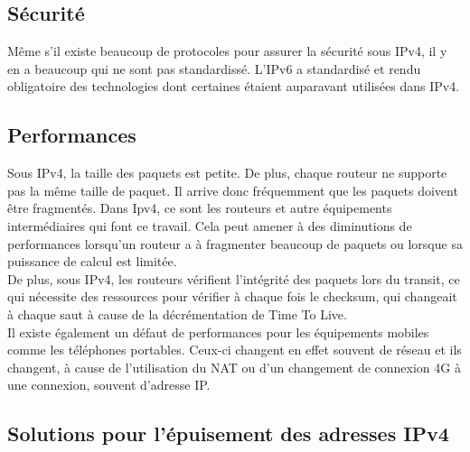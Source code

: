 \subsection{Sécurité}
Même s'il existe beaucoup de protocoles pour assurer la sécurité sous IPv4, il y en a 
beaucoup qui ne sont pas standardissé. L'IPv6 a standardisé et rendu obligatoire des 
technologies dont certaines étaient auparavant utilisées dans IPv4. 

\subsection{Performances}
Sous IPv4, la taille des paquets est petite. De plus, chaque routeur ne supporte pas la même taille
de paquet. Il arrive donc fréquemment que les paquets doivent être fragmentés. Dans Ipv4, ce sont les 
routeurs et autre équipements intermédiaires qui font ce travail. Cela peut amener à
des diminutions de performances lorsqu'un routeur a à fragmenter beaucoup de paquets ou
lorsque sa puissance de calcul est limitée. 
\\
De plus, sous IPv4, les routeurs vérifient l'intégrité des paquets lors du transit, ce qui nécessite 
des ressources pour vérifier à chaque fois le checksum, qui changeait à chaque saut à cause
de la décrémentation de Time To Live.
\\
Il existe également un défaut de performances pour les équipements mobiles comme les téléphones 
portables. Ceux-ci changent en effet souvent de réseau et ils changent, à cause de 
l'utilisation du NAT ou d'un changement de connexion 4G à une connexion, souvent d'adresse IP. 
\\


\subsection{Solutions pour l'épuisement des adresses IPv4}

